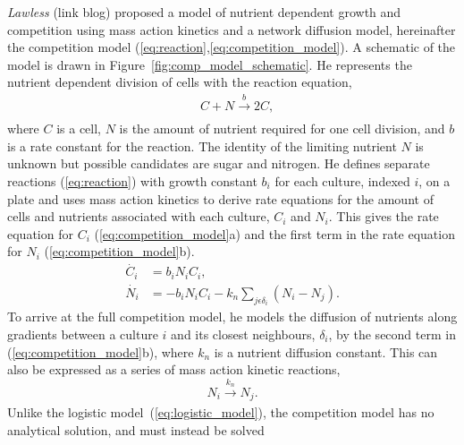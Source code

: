 \textit{Lawless} (link blog) proposed a model of nutrient dependent
growth and competition using mass action kinetics and a network
diffusion model, hereinafter the competition model
(\ref{eq:reaction},\ref{eq:competition_model}). A schematic of the
model is drawn in Figure~\ref{fig:comp_model_schematic}. He represents
the nutrient dependent division of cells with the reaction equation,
\begin{subequations}
  \label{eq:reaction}
  \begin{align}
    &C + N \xrightarrow[]{b} 2C,
  \end{align}
\end{subequations}
where \(C\) is a cell, \(N\) is the amount of nutrient required for
one cell division, and \(b\) is a rate constant for the reaction. The
identity of the limiting nutrient \(N\) is unknown but possible
candidates are sugar and nitrogen. He defines separate reactions
(\ref{eq:reaction}) with growth constant \(b_{i}\) for each culture,
indexed \(i\), on a plate and uses mass action kinetics to derive rate
equations for the amount of cells and nutrients associated with each
culture, \(C_{i}\) and \(N_{i}\). This gives the rate equation for
\(C_{i}\) (\ref{eq:competition_model}a) and the first term in the rate
equation for \(N_{i}\) (\ref{eq:competition_model}b).
\begin{subequations}
  \label{eq:competition_model}
  \begin{align}
    \dot{C_{i}}& = b_{i}N_{i}C_{i},\\
    \dot{N_{i}}& = - b_{i}N_{i}C_{i} - k_{n}\sum_{j \epsilon \delta_i}(N_{i} - N_{j}).
  \end{align}
\end{subequations}
To arrive at the full competition model, he models the diffusion of
nutrients along gradients between a culture \(i\) and its closest
neighbours, \(\delta_{i}\), by the second term in
(\ref{eq:competition_model}b), where \(k_{n}\) is a nutrient diffusion
constant. This can also be expressed as a series of mass action kinetic
reactions,
\begin{equation}
    N_{i} \xrightarrow[]{k_{n}} N_{j}.
  \label{eq:diffusion_reaction}
\end{equation}
Unlike the logistic model~(\ref{eq:logistic_model}), the competition
model has no analytical solution, and must instead be solved
